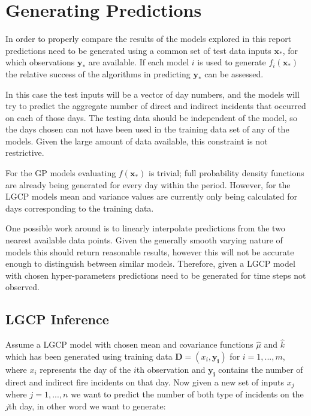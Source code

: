\documentclass[a4paper,11pt]{report}
\begin{document}
\chapter{Generating Predictions}

In order to properly compare the results of the models explored in this report predictions need to be generated using a common set of test data inputs \(\mathbf{x_*}\), for which observations \(\mathbf{y}_*\) are available. If each model \(i\) is used to generate \(f_i(\mathbf{x_*})\) the relative success of the algorithms in predicting \(\mathbf{y}_*\) can be assessed. \par

In this case the test inputs will be a vector of day numbers, and the models will try to predict the aggregate number of direct and indirect incidents that occurred on each of those days. The testing data should be independent of the model, so the days chosen can not have been used in the training data set of any of the models. Given the large amount of data available, this constraint is not restrictive. \par

For the GP models evaluating \(f(\mathbf{x_*})\) is trivial; full probability density functions are already being generated for every day within the period. However, for the LGCP models mean and variance values are currently only being calculated for days corresponding to the training data. \par

One possible work around is to linearly interpolate predictions from the two nearest available data points. Given the generally smooth varying nature of models this should return reasonable results, however this will not be accurate enough to distinguish between similar models. Therefore, given a LGCP model with chosen hyper-parameters predictions need to be generated for time steps not observed.

\section{LGCP Inference}

Assume a LGCP model with chosen mean and covariance functions \(\hat{\mu}\) and \(\hat{k}\) which has been generated using training data \(\mathbf{D} = (x_i,\mathbf{y_i})\) for  \(i = 1,...,m\), where \(x_i\) represents the day of the \(i\)th observation and \(\mathbf{y_i}\) contains the number of direct and indirect fire incidents on that day. Now given a new set of inputs \(x_j\) where \(j = 1,...,n\) we want to predict the number of both type of incidents on the \(j\)th day, in other word we want to generate:
\end{document}
